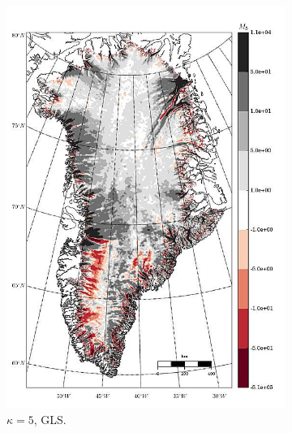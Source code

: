 \begin{figure}
  \begin{subfigure}[b]{0.25\linewidth}
    \includegraphics[width=\linewidth]{images/balance_velocity/greenland/misfit_5H_kappa_5_GLS.jpg}
  \caption{$\kappa = 5$, GLS.}
  \label{greenland_bv_image_kappa_5_GLS_misfit}
  \end{subfigure}
  \begin{subfigure}[b]{0.25\linewidth}

\end{subfigure}
\end{figure}
